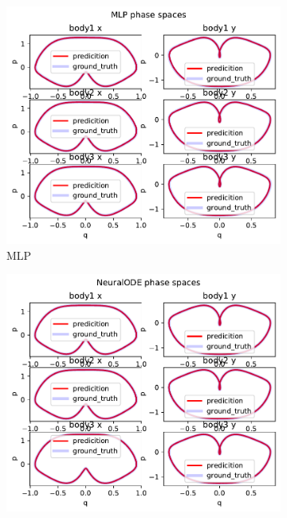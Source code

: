 \begin{figure}[H]
	\centering
	\begin{subfigure}[b]{0.3\textwidth}
		\centering
		\includegraphics[width=\textwidth]{chapters/chapter5/body3_mlp_ps.pdf}
		\caption{MLP}
	\end{subfigure}
	\hfill
	\begin{subfigure}[b]{0.3\textwidth}
		\centering
		\includegraphics[width=\textwidth]{chapters/chapter5/body3_ode_ps.pdf}

\end{subfigure}
\end{figure}
